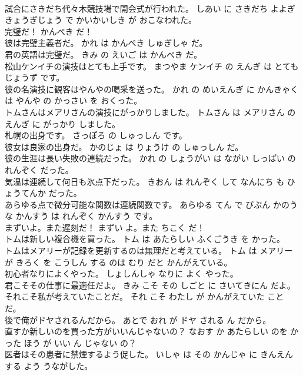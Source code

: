 \documentclass[8pt]{extreport}
\begin{document}
\begin{CJK}{UTF8}{min}
\\	試合にさきだち代々木競技場で開会式が行われた。	しあい に さきだち よよぎ きょうぎじょう で かいかいしき が おこなわれた。	
\\	完璧だ！	かんぺき だ！	
\\	彼は完璧主義者だ。	かれ は かんぺき しゅぎしゃ だ。	
\\	君の英語は完璧だ。	きみ の えいご は かんぺき だ。	
\\	松山ケンイチの演技はとても上手です。	まつやま ケンイチ の えんぎ は とても じょうず です。	
\\	彼の名演技に観客はやんやの喝采を送った。	かれ の めいえんぎ に かんきゃく は やんや の かっさい を おくった。	
\\	トムさんはメアリさんの演技にがっかりしました。	トムさん は メアリさん の えんぎ に がっかり しました。	
\\	札幌の出身です。	さっぽろ の しゅっしん です。	
\\	彼女は良家の出身だ。	かのじょ は りょうけ の しゅっしん だ。	
\\	彼の生涯は長い失敗の連続だった。	かれ の しょうがい は ながい しっぱい の れんぞく だった。	
\\	気温は連続して何日も氷点下だった。	きおん は れんぞく して なんにち も ひょうてんか だった。	
\\	あらゆる点で微分可能な関数は連続関数です。	あらゆる てん で びぶん かのう な かんすう は れんぞく かんすう です。	
\\	まずいよ。また遅刻だ！	まずい よ。また ちこく だ！	
\\	トムは新しい複合機を買った。	トム は あたらしい ふくごうき を かった。	
\\	トムはメアリーが記録を更新するのは無理だと考えている。	トム は メアリー が きろく を こうしん する のは むり だと かんがえている。	
\\	初心者なりによくやった。	しょしんしゃ なりに よく やった。	
\\	君こそその仕事に最適任だよ。	きみ こそ その しごと に さいてきにん だよ。	
\\	それこそ私が考えていたことだ。	それ こそ わたし が かんがえていた こと だ。	
\\	後で俺がドヤされるんだから。	あとで おれ が ドヤ される ん だから。	
\\	直すか新しいのを買った方がいいんじゃないの？	なおす か あたらしい のを かった ほう が いい ん じゃない の？	
\\	医者はその患者に禁煙するよう促した。	いしゃ は その かんじゃ に きんえん する よう うながした。	

\end{CJK}
\end{document}
